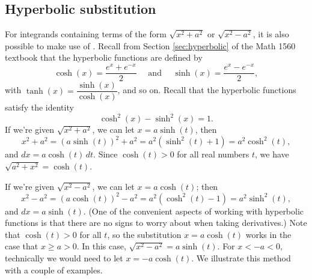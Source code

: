 \subsection*{Hyperbolic substitution}
For integrands containing terms of the form $\sqrt{x^2+a^2}$ or $\sqrt{x^2-a^2}$, it is also possible to make use of  . Recall from Section \ref{sec:hyperbolic} of the Math 1560 textbook that the hyperbolic functions are defined by
\[
\cosh(x) = \frac{e^x+e^{-x}}{2} \quad \text{ and } \quad \sinh(x) = \frac{e^x-e^{-x}}{2},
\]
with $\tanh(x) = \dfrac{\sinh(x)}{\cosh(x)}$, and so on. Recall that the hyperbolic functions satisfy the identity
\[
\cosh^2(x)-\sinh^2(x)  = 1.
\]
If we're given $\sqrt{x^2+a^2}$, we can let $x=a\sinh(t)$, then
\[
x^2+a^2 = (a\sinh(t))^2+a^2 = a^2(\sinh^2(t)+1) = a^2\cosh^2(t),
\]
and $dx = a\cosh(t)\,dt$. Since $\cosh(t)>0$ for all real numbers $t$, we have $\sqrt{a^2+x^2}=\cosh(t)$.

If we're given $\sqrt{x^2-a^2}$, we can let $x=a\cosh(t)$; then
\[
x^2-a^2 = (a\cosh(t))^2-a^2 = a^2(\cosh^2(t)-1) = a^2\sinh^2(t),
\]
and $dx = a\sinh(t)$. (One of the convenient aspects of working with hyperbolic functions is that there are no signs to worry about when taking derivatives.)
Note that $\cosh(t)>0$ for all $t$, so the substitution $x=a\cosh(t)$ works in the case that $x\geq a>0$. In this case, $\sqrt{x^2-a^2} = a\sinh(t)$. For $x<-a<0$, technically we would need to let $x=-a\cosh(t)$. We illustrate this method with a couple of examples.\\

